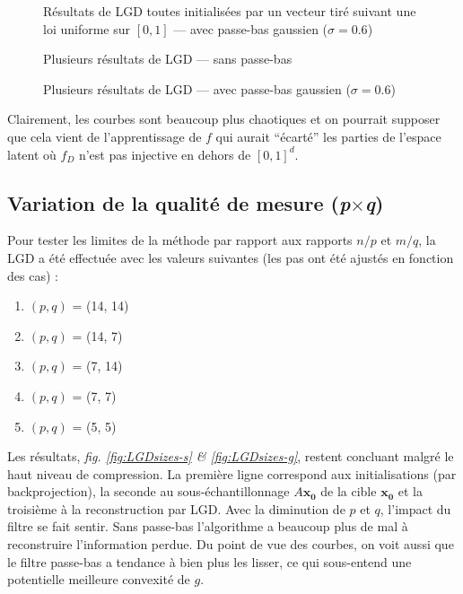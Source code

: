 \documentclass[hidelinks, french]{article} %
\renewcommand{\bf}[1]{\boldsymbol{#1}}
\theoremstyle{enonce}
\theoremstyle{special}
\theoremstyle{rq}
\theoremstyle{exo}
\theoremstyle{demo}
\begin{document}
\begin{figure}[H]\centering
	
	\caption{Résultats de LGD toutes initialisées par un vecteur tiré suivant une loi uniforme sur $[0,1]$ ---  avec passe-bas gaussien ($\sigma=0.6$)}
	\label{fig:LGDunif-g}
\end{figure}
\begin{figure}[H]\centering
	
	\caption{Plusieurs résultats de LGD --- sans passe-bas}
	\label{fig:LGDgauss-s}
\end{figure}
\begin{figure}[H]\centering
	
	\caption{Plusieurs résultats de LGD ---  avec passe-bas gaussien ($\sigma=0.6$)}
	\label{fig:LGDgauss-g}
\end{figure}

\noindent Clairement, les courbes sont beaucoup plus chaotiques et on pourrait supposer que cela vient de l'apprentissage de $f$ qui aurait ``écarté'' les parties de l'espace latent où $f_D$ n'est pas injective en dehors de $[0,1]^d$.


\subsection{Variation de la qualité de mesure (\textit{p}$\times$\textit{q})}\label{sec:LGDsize}

Pour tester les limites de la méthode par rapport aux rapports $n/p$ et $m/q$, la LGD a été effectuée avec les valeurs suivantes (les pas ont été ajustés en fonction des cas) :
\begin{enumerate}[label=(\arabic*)]
	\item $(p,q)$ = (14, 14)
	\item $(p,q)$ = (14, 7)
	\item $(p,q)$ = (7, 14)
	\item $(p,q)$ = (7, 7)
	\item $(p,q)$ = (5, 5)
\end{enumerate}

Les résultats, \textit{fig. \ref{fig:LGDsizes-s} \& \ref{fig:LGDsizes-g}}, restent concluant malgré le haut niveau de compression. La première ligne correspond aux initialisations (par backprojection), la seconde au sous-échantillonnage $A\bf{x_0}$ de la cible $\bf{x_0}$ et la troisième à la reconstruction par LGD. Avec la diminution de $p$ et $q$, l'impact du filtre se fait sentir. Sans passe-bas l'algorithme a beaucoup plus de mal à reconstruire l'information perdue. Du point de vue des courbes, on voit aussi que le filtre passe-bas a tendance à bien plus les lisser, ce qui sous-entend une potentielle meilleure convexité de $g$.
\end{document}
